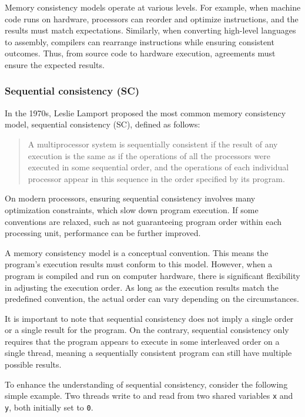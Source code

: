 \documentclass[fontsize=10pt, oneside]{scrartcl}
\newcommand{\monobox}[1]{\mbox{\texttt{#1}}}
\begin{document}
Memory consistency models operate at various levels.
For example, when machine code runs on hardware, processors can reorder and optimize instructions, and the results must match expectations.
Similarly, when converting high-level languages to assembly, compilers can rearrange instructions while ensuring consistent outcomes.
Thus, from source code to hardware execution, agreements must ensure the expected results.

\subsubsection{Sequential consistency (SC)}

In the 1970s, Leslie Lamport proposed the most common memory consistency model, sequential consistency (SC), defined as follows:

\begin{quote}
A multiprocessor system is sequentially consistent if the result of any execution is the same as if the operations of all the processors were executed in some sequential order, and the operations of each individual processor appear in this sequence in the order specified by its program.
\end{quote}

On modern processors, ensuring sequential consistency involves many optimization constraints, which slow down program execution.
If some conventions are relaxed, such as not guaranteeing program order within each processing unit, performance can be further improved.

A memory consistency model is a conceptual convention.
This means the program's execution results must conform to this model.
However, when a program is compiled and run on computer hardware, there is significant flexibility in adjusting the execution order.
As long as the execution results match the predefined convention, the actual order can vary depending on the circumstances.

It is important to note that sequential consistency does not imply a single order or a single result for the program.
On the contrary, sequential consistency only requires that the program appears to execute in some interleaved order on a single thread, meaning a sequentially consistent program can still have multiple possible results.

To enhance the understanding of sequential consistency, consider the following simple example.
Two threads write to and read from two shared variables \monobox{x} and \monobox{y}, both initially set to \monobox{0}.
\end{document}
